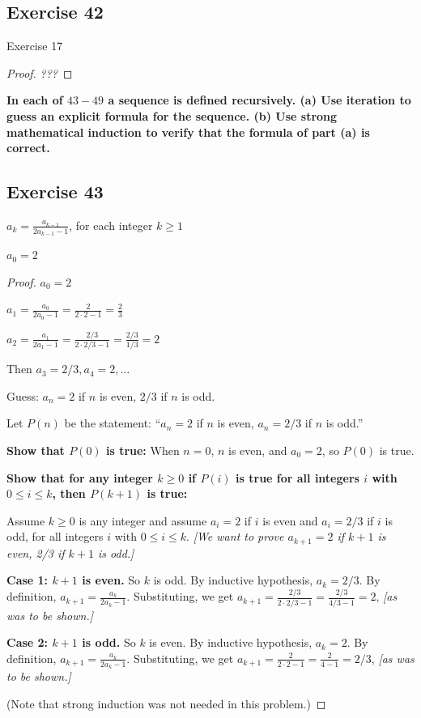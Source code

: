 \documentclass[14pt]{extarticle}
\newcommand{\dps}{\displaystyle}
\newcommand{\cy}{\color{cyan}}
\begin{document}
\subsection{Exercise 42}
Exercise 17

\begin{proof}
{\it ???}
\end{proof}

{\bf \cy In each of $43-49$ a sequence is defined recursively. (a) Use iteration to guess an explicit formula 
for the sequence. (b) Use strong mathematical induction to verify that the formula of part (a) is correct.}

\subsection{Exercise 43}
\(a_k = \dps \frac{a_{k-1}}{2a_{k-1}-1}\), for each integer \(k \geq 1\)

\(a_0 = 2\)

\begin{proof}
\(a_0 = 2\)

\(a_1 = \dps \frac{a_0}{2a_0-1} = \frac{2}{2 \cdot 2 -1} = \frac{2}{3}\)

\(a_2 = \dps \frac{a_1}{2a_1-1} = \frac{2/3}{2 \cdot 2/3 -1} = \frac{2/3}{1/3} = 2\)

Then \(a_3 = 2/3, a_4 = 2, \ldots\)

Guess: \(a_n = 2\) if $n$ is even, $2/3$ if $n$ is odd.

Let $P(n)$ be the statement: ``\(a_n = 2\) if $n$ is even, \(a_n = 2/3\) if $n$ is odd.''

{\bf Show that $P(0)$ is true:} When $n = 0$, $n$ is even, and $a_0 = 2$, so $P(0)$ is true.

{\bf Show that for any integer \(k \geq 0\) if $P(i)$ is true for all integers $i$ with \(0 \leq i \leq k\), then
$P(k+1)$ is true:}

Assume \(k \geq 0\) is any integer and assume \(a_i = 2\) if $i$ is even and \(a_i = 2/3\) if $i$ is odd,
for all integers $i$ with \(0 \leq i \leq k\). {\it [We want to prove \(a_{k+1} = 2\) if $k+1$ is even, 2/3 if 
$k+1$ is odd.]}

{\bf Case 1: $k+1$ is even.} So $k$ is odd. By inductive hypothesis, \(a_k = 2/3\).
By definition, \(a_{k+1} = \dps \frac{a_k}{2a_k-1}\).
Substituting, we get \(a_{k+1} = \dps \frac{2/3}{2 \cdot 2/3 -1} = \frac{2/3}{4/3 - 1} = 2\), {\it [as was to be shown.]}

{\bf Case 2: $k+1$ is odd.} So $k$ is even. By inductive hypothesis, \(a_k = 2\).
By definition, \(a_{k+1} = \dps \frac{a_k}{2a_k-1}\).
Substituting, we get \(a_{k+1} = \dps \frac{2}{2 \cdot 2 -1} = \frac{2}{4 - 1} = 2/3\), {\it [as was to be shown.]}

(Note that strong induction was not needed in this problem.)
\end{proof}
\end{document}

